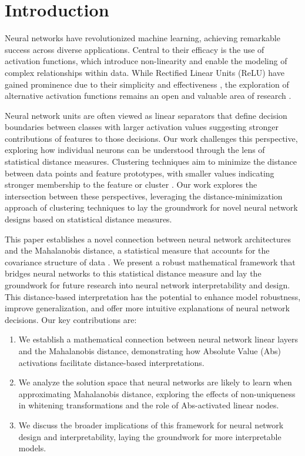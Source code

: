 \section{Introduction}

Neural networks have revolutionized machine learning, achieving remarkable success across diverse applications. Central to their efficacy is the use of activation functions, which introduce non-linearity and enable the modeling of complex relationships within data. While Rectified Linear Units (ReLU) have gained prominence due to their simplicity and effectiveness \citep{nair2010rectified}, the exploration of alternative activation functions remains an open and valuable area of research \citep{ramachandran2017searching}.

Neural network units are often viewed as linear separators that define decision boundaries between classes \citep{minsky1969perceptrons} with larger activation values suggesting stronger contributions of features to those decisions. Our work challenges this perspective, exploring how individual neurons can be understood through the lens of statistical distance measures. Clustering techniques aim to minimize the distance between data points and feature prototypes, with smaller values indicating stronger membership to the feature or cluster \citep{macqueen1967methods}. Our work explores the intersection between these perspectives, leveraging the distance-minimization approach of clustering techniques to lay the groundwork for novel neural network designs based on statistical distance measures.

This paper establishes a novel connection between neural network architectures and the Mahalanobis distance, a statistical measure that accounts for the covariance structure of data \citep{mahalanobis1936generalized}. We present a robust mathematical framework that bridges neural networks to this statistical distance measure and lay the groundwork for future research into neural network interpretability and design. This distance-based interpretation has the potential to enhance model robustness, improve generalization, and offer more intuitive explanations of neural network decisions. Our key contributions are:

\begin{enumerate}
    \item We establish a mathematical connection between neural network linear layers and the Mahalanobis distance, demonstrating how Absolute Value (Abs) activations facilitate distance-based interpretations.
    \item We analyze the solution space that neural networks are likely to learn when approximating Mahalanobis distance, exploring the effects of non-uniqueness in whitening transformations and the role of Abs-activated linear nodes.
    \item We discuss the broader implications of this framework for neural network design and interpretability, laying the groundwork for more interpretable models.
\end{enumerate}
